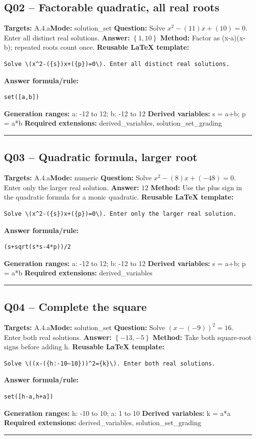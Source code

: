 \documentclass[11pt]{article}
\begin{document}
\subsection{Q02 -- Factorable quadratic, all real roots}
\textbf{Targets:} A.4.a\quad\textbf{Mode:} solution\_set
\textbf{Question:} Solve \(x^2-(11)x+(10)=0\). Enter all distinct real solutions.
\textbf{Answer:} \(\left\{1, 10\right\}\)
\textbf{Method:} Factor as (x-a)(x-b); repeated roots count once.
\textbf{Reusable LaTeX template:}
\begin{verbatim}
Solve \(x^2-({s})x+({p})=0\). Enter all distinct real solutions.
\end{verbatim}
\textbf{Answer formula/rule:}
\begin{verbatim}
set([a,b])
\end{verbatim}
\textbf{Generation ranges:} a: -12 to 12; b: -12 to 12
\textbf{Derived variables:} s = a+b; p = a*b
\textbf{Required extensions:} derived\_variables, solution\_set\_grading
\medskip\hrule\medskip
\subsection{Q03 -- Quadratic formula, larger root}
\textbf{Targets:} A.4.a\quad\textbf{Mode:} numeric
\textbf{Question:} Solve \(x^2-(8)x+(-48)=0\). Enter only the larger real solution.
\textbf{Answer:} \(12\)
\textbf{Method:} Use the plus sign in the quadratic formula for a monic quadratic.
\textbf{Reusable LaTeX template:}
\begin{verbatim}
Solve \(x^2-({s})x+({p})=0\). Enter only the larger real solution.
\end{verbatim}
\textbf{Answer formula/rule:}
\begin{verbatim}
(s+sqrt(s*s-4*p))/2
\end{verbatim}
\textbf{Generation ranges:} a: -12 to 12; b: -12 to 12
\textbf{Derived variables:} s = a+b; p = a*b
\textbf{Required extensions:} derived\_variables
\medskip\hrule\medskip
\subsection{Q04 -- Complete the square}
\textbf{Targets:} A.4.a\quad\textbf{Mode:} solution\_set
\textbf{Question:} Solve \((x-(-9))^2=16\). Enter both real solutions.
\textbf{Answer:} \(\left\{-13, -5\right\}\)
\textbf{Method:} Take both square-root signs before adding h.
\textbf{Reusable LaTeX template:}
\begin{verbatim}
Solve \((x-({h:-10–10}))^2={k}\). Enter both real solutions.
\end{verbatim}
\textbf{Answer formula/rule:}
\begin{verbatim}
set([h-a,h+a])
\end{verbatim}
\textbf{Generation ranges:} h: -10 to 10; a: 1 to 10
\textbf{Derived variables:} k = a*a
\textbf{Required extensions:} derived\_variables, solution\_set\_grading
\medskip\hrule\medskip
\end{document}
